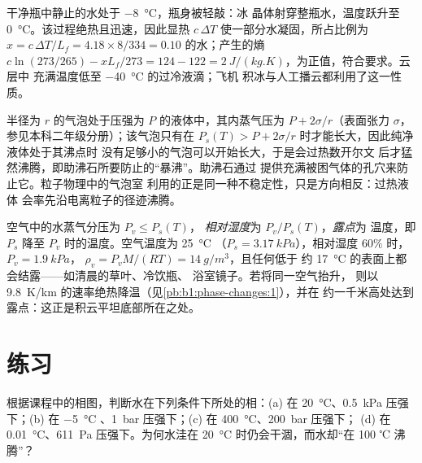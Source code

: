 \begin{example}[过冷的瓶子]\label{ex:b1:phase-changes:supercooled}
干净瓶中静止的水处于 \qty{-8}{\degreeCelsius}，瓶身被轻敲：冰
晶体射穿整瓶水，温度跃升至
\qty{0}{\degreeCelsius}。该过程绝热且迅速，因此显热
$c\,\Delta T$ 使一部分水凝固，所占比例为 $x = c\,\Delta T/L_f = 4.18 \times 8/334 =
0.10$ 的水；产生的熵 $c\ln(273/265) - xL_f/273 =
124 - 122 = \qty{+2}{J/(kg.K)}$，为正值，符合要求。云层中
充满温度低至 \qty{-40}{\degreeCelsius} 的过冷液滴；飞机
积冰与人工播云都利用了这一性质。
\end{example}

\begin{remark}[助沸石与气泡室]\label{rem:b1:phase-changes:nucleation}
半径为 $r$ 的气泡处于压强为 $P$ 的液体中，其内蒸气压为
$P + 2\sigma/r$（表面张力 $\sigma$，参见本科二年级分册）；该气泡只有在
$P_s(T) > P + 2\sigma/r$ 时才能长大，因此纯净液体处于其沸点时
没有足够小的气泡可以开始长大，于是会过热数开尔文
后才猛然沸腾，即助沸石所要防止的“暴沸”。助沸石通过
提供充满被困气体的孔穴来防止它。粒子物理中的气泡室
利用的正是同一种不稳定性，只是方向相反：过热液体
会率先沿电离粒子的径迹沸腾。
\end{remark}

\begin{example}[湿度与结露]\label{ex:b1:phase-changes:dew}
空气中的水蒸气分压为 $P_v \leq P_s(T)$，
\emph{相对湿度}为 $P_v/P_s(T)$，\emph{露点}为
温度，即 $P_s$ 降至 $P_v$ 时的温度。空气温度为 \qty{25}{\degreeCelsius}
（$P_s = \qty{3.17}{kPa}$），相对湿度 $60\%$ 时，$P_v = \qty{1.9}{kPa}$，
$\rho_v = P_vM/(RT) = \qty{14}{g/m^3}$，且任何低于
约 \qty{17}{\degreeCelsius} 的表面上都会结露——如清晨的草叶、冷饮瓶、
浴室镜子。若将同一空气抬升，
则以 \qty{9.8}{K/km} 的速率绝热降温（见\cref{pb:b1:phase-changes:1}），并在
约一千米高处达到露点：这正是积云平坦底部所在之处。
\end{example}

\section{练习}

\begin{exercise}[$\star$]\label{exo:b1:phase-changes:1}
根据课程中的相图，判断水在下列条件下所处的相：(a) 在
\qty{20}{\degreeCelsius}、\qty{0.5}{kPa} 压强下；(b) 在 \qty{-5}{\degreeCelsius}
、\qty{1}{bar} 压强下；(c) 在 \qty{400}{\degreeCelsius}、\qty{200}{bar} 压强下；
(d) 在 \qty{0.01}{\degreeCelsius}、\qty{611}{Pa} 压强下。为何水洼在
\qty{20}{\degreeCelsius} 时仍会干涸，而水却“在 100 ℃ 沸腾”？
\end{exercise}

